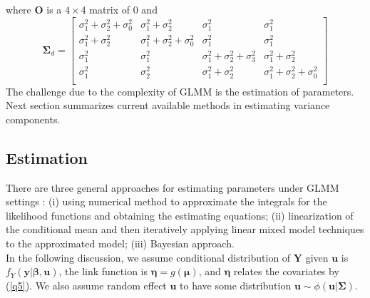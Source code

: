 	where $\bm O$ is a $4\times 4$ matrix of 0 and 
		\[
		\bm \Sigma_d = \left[
		\begin{array}{cccc}
		\sigma^2_1+ \sigma^2_2 + \sigma^2_0  & \sigma^2_1+\sigma^2_2 & \sigma^2_1 &\sigma^2_1\\
		\sigma^2_1+\sigma^2_2 & \sigma^2_1 +\sigma^2_2 +\sigma^2_0 &\sigma^2_1 &\sigma^2_1\\
		\sigma^2_1 & \sigma^2_1& \sigma^2_1+\sigma^2_2+\sigma^2_3 & \sigma^2_1 + \sigma^2_2\\
		\sigma^2_1 &\sigma^2_2 &\sigma^2_1 +\sigma^2_2 & \sigma^2_1 +\sigma^2_2 +\sigma^2_0\\
		\end{array}
		\right]
		\]
	The challenge due to the complexity of GLMM is the estimation of parameters. Next section summarizes current available methods in estimating variance components.
	
	\subsection{Estimation}	
	There are three general approaches for estimating parameters under GLMM settings \citep[Chapter 7]{myers2012generalized}: (i) using numerical method to approximate the integrals for the likelihood functions and obtaining the estimating equations; (ii) linearization of the conditional mean and then iteratively applying linear mixed model techniques to the approximated model; (iii) Bayesian approach. \\

	

	In the following discussion, we assume conditional distribution of $\bm  Y$ given $\bm u$ is  $f_{Y}(\bm y|\bm \beta, \bm u)$,  the link function is $\bm \eta = g(\bm \mu)$, and $\bm \eta$ relates the covariates by (\ref{q5}). We also assume random effect $\bm u$ to have some distribution $\bm u \sim \phi(\bm u|\bm \Sigma)$. 

